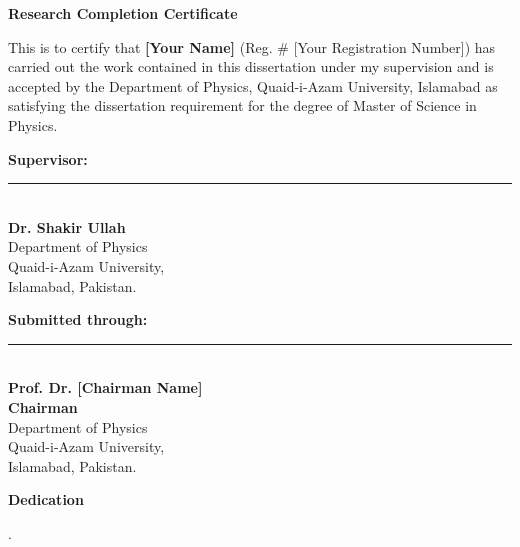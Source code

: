 \documentclass[12pt,a4paper]{report}
\begin{document}
\newpage
\begin{titlepage}
	 \begin{center}
		{\Large \textbf{Research Completion Certificate}}
	\end{center}
	\vspace{0.4cm}
	This is to certify that \textbf{[Your Name]} (Reg. \# [Your Registration Number]) has carried out the work contained in this dissertation under my supervision and is accepted by the Department of Physics, Quaid-i-Azam University, Islamabad as satisfying the dissertation requirement for the degree of Master of Science in Physics.\\
	\vspace{1cm}

	\begin{flushright}
		\textbf{Supervisor:}\\[6pt]
		\vspace{1cm}
		\rule{3.5cm}{0.4pt}\\
		\textbf{Dr. Shakir Ullah}\\
		Department of Physics\\
		Quaid-i-Azam University,\\
		Islamabad, Pakistan.
	\end{flushright}
	\vspace{1cm}
	\textbf{Submitted through:}\\[12pt]

	\begin{flushleft}
		\rule{3.5cm}{0.4pt}\\
		\textbf{Prof. Dr. [Chairman Name]}\\
		\textbf{Chairman}\\
		Department of Physics\\
		Quaid-i-Azam University,\\
		Islamabad, Pakistan.
	\end{flushleft}
\end{titlepage}

\newpage
\begin{titlepage}
 \begin{center}
	{\Large \textbf{Dedication}}
\end{center}
\vspace{0.4cm}
.\\
\end{titlepage}
\end{document}
